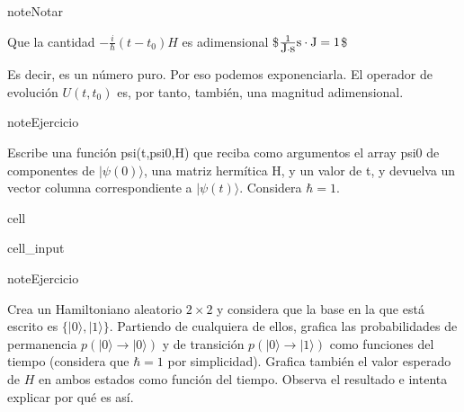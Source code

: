 \documentclass[letterpaper,10pt,english]{jupyterBook}
\newcommand{\ket}[1]{|#1\rangle}
\begin{document}
\begin{sphinxadmonition}{note}{Notar}

\sphinxAtStartPar
Que la cantidad \({-\frac{i}{\hbar} (t-t_0) H }\) es adimensional
\$\(
\frac{1}{\hbox{J}\cdot \hbox{s}}\hbox{s}\cdot\hbox{J} = 1
\)\$

\sphinxAtStartPar
Es decir, es un número puro. Por eso podemos exponenciarla. El operador de evolución \(U(t,t_0)\) es, por tanto, también, una magnitud adimensional.
\end{sphinxadmonition}

\begin{sphinxadmonition}{note}{Ejercicio}

\sphinxAtStartPar
Escribe una función psi(t,psi0,H) que reciba como argumentos el array psi0 de componentes de \(\ket{\psi(0)}\), una matriz hermítica H, y un valor de t, y devuelva un vector columna correspondiente a \(\ket{\psi(t)}\). Considera \(\hbar=1\).
\end{sphinxadmonition}

\begin{sphinxuseclass}{cell}\begin{sphinxVerbatimInput}

\begin{sphinxuseclass}{cell_input}
\begin{sphinxVerbatim}[commandchars=\\\{\}]
 
      
      \PYG{p}{[}\PYG{p}{]}
       
    
     
       
     
\end{sphinxVerbatim}

\end{sphinxuseclass}\end{sphinxVerbatimInput}

\end{sphinxuseclass}
\begin{sphinxadmonition}{note}{Ejercicio}

\sphinxAtStartPar
Crea un Hamiltoniano aleatorio \(2\times 2\) y considera que la base en la que está escrito es \(\{\ket{0},\ket{1}\}\). Partiendo de cualquiera de ellos, grafica las probabilidades de permanencia \(p(\ket{0}\to \ket{0})\) y de transición \(p(\ket{0}\to \ket{1})\) como funciones del tiempo (considera que \(\hbar = 1\) por simplicidad). Grafica también el valor esperado de \(H\) en ambos estados como función del tiempo. Observa el resultado e intenta explicar por qué es así.
\end{sphinxadmonition}
\end{document}
